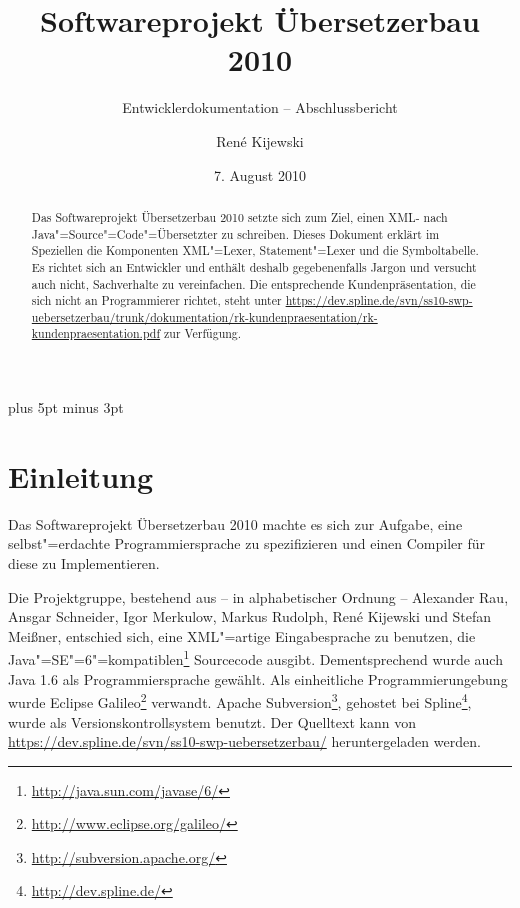 \documentclass[10pt,a4paper,ngerman,titlepage,tocindentauto]{scrartcl}
\newcommand{\link}[1]{\href{#1}{#1}}
\newcommand{\fnlink}[1]{\footnote{\link{#1}}}
\newcommand{\n}{\linebreak[1]}
\begin{document}
	\begin{titlepage}
		\titlehead{\texttt{[image: graphiken/Fub-logo.pdf]}}
		\title{Softwareprojekt Übersetzerbau 2010} 
		\subtitle{Entwicklerdokumentation -- Abschlussbericht}
		\author{René Kijewski} 
		\date{7. August 2010}
		\maketitle
	\end{titlepage}
	
	\begin{abstract}
		Das Softwareprojekt Übersetzerbau 2010 setzte sich zum Ziel, einen XML- nach Java"=Source"=Code"=Übersetzter
		zu schreiben.
		Dieses Dokument erklärt im Speziellen die Komponenten XML"=Lexer, Statement"=Lexer
		und die Symboltabelle. Es richtet sich an Entwickler und enthält deshalb gegebenenfalls
		Jargon und versucht auch nicht, Sachverhalte zu vereinfachen.
		Die entsprechende Kundenpräsentation, die sich nicht an Programmierer richtet, steht unter
		\href{https://dev.spline.de/svn/ss10-swp-uebersetzerbau/trunk/dokumentation/rk-kundenpraesentation/rk-kundenpraesentation.pdf}
		{https://{\n}dev.spline.de/{\n}svn/{\n}ss10-swp-uebersetzerbau/{\n}trunk/dokumentation/{\n}rk-kundenpraesentation/{\n}rk-kundenpraesentation.pdf}
		zur Verfügung.
	\end{abstract}

	{
		\pagestyle{empty}
		\tableofcontents
		\newpage
	}
	
	\parskip 7pt plus 5pt minus 3pt
	\section{Einleitung}
		Das Softwareprojekt Übersetzerbau 2010 machte es sich zur Aufgabe, eine selbst"=erdachte Programmiersprache
		zu spezifizieren und einen Compiler für diese zu Implementieren.
		
		Die Projektgruppe, bestehend aus -- in alphabetischer Ordnung --
			Alexander Rau,
			Ansgar Schneider,
			Igor Merkulow,
			Markus Rudolph,
			René Kijewski und
			Stefan Meißner,
		entschied sich, eine XML"=artige Eingabesprache zu benutzen, die
		Java"=SE"=6"=kompatiblen\fnlink{http://java.sun.com/javase/6/} Sourcecode ausgibt.
		Dementsprechend wurde auch Java 1.6 als Programmiersprache gewählt.
		Als einheitliche Programmierungebung wurde Eclipse Galileo\fnlink{http://www.eclipse.org/galileo/} verwandt.
		Apache Subversion\fnlink{http://subversion.apache.org/}, gehostet bei Spline\fnlink{http://dev.spline.de/}, wurde als
		Versionskontrollsystem benutzt. Der Quelltext kann von \link{https://dev.spline.de/svn/ss10-swp-uebersetzerbau/}
		heruntergeladen werden.
		
\end{document}
